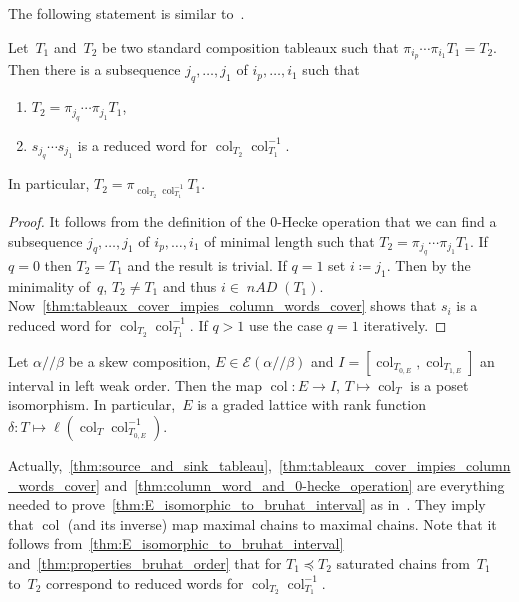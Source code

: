 \documentclass[ALCO,ThmDefs,Unicode,epreuves]{cedram}
\newcommand{\mc}[1]{\mathcal{#1} }
\newcommand{\nAD}{\operatorname{\mathit{nAD}}}
\newcommand{\fs}{s}
\newcommand{\col}{\operatorname{col}}
\newcommand{\ab}{{\alpha / \! \! / \beta}}
\newcommand{\pleq}{\preceq}
\begin{document}
The following statement is similar to~\cite[Lemma~4.3]{Tewari2015}.
\begin{lemma}
	\label{thm:column_word_and_0-hecke_operation}
	Let~$T_1$ and~$T_2$ be two standard composition tableaux such that $\pi_{i_p} \cdots \pi_{i_1} T_1 = T_2$. Then there is a subsequence $j_q, \ldots, j_1$ of $i_p, \ldots,i_1$ such that
	\begin{enumerate}
		\item
		$T_2 = \pi_{j_q} \cdots \pi_{j_1}T_1$,
		\item 
		$\fs_{j_q} \cdots \fs_{j_1}$ is a reduced word for $\col_{T_2}\col^{-1}_{T_1}$.
	\end{enumerate}
	In particular, $T_2 = \pi_{\col_{T_2}\col^{-1}_{T_1}} T_1$.
\end{lemma}


\begin{proof} It follows from the definition of the 0-Hecke operation that we can find a subsequence $j_q, \ldots, j_1$ of $i_p, \ldots,i_1$ of minimal length such that $T_2 = \pi_{j_q} \cdots \pi_{j_1}T_1$. If~$q=0$ then $T_2 = T_1$ and the result is trivial. If $q=1$ set $i \coloneqq j_1$. Then by the minimality of~$q$, $T_2 \neq T_1$ and thus $i\in \nAD(T_1)$. Now~\cref{thm:tableaux_cover_impies_column_words_cover} shows that $\fs_i$ is a reduced word for $\col_{T_2}\col^{-1}_{T_1}$. If $q>1$ use the case $q=1$ iteratively.
\end{proof}



\begin{thm}
	\label{thm:E_isomorphic_to_bruhat_interval}
	Let $\ab$ be a skew composition, $E\in \mc E(\ab)$ and $I = [\col_{T_{0,E}}, \col_{T_{1,E}}]$ an interval in left weak order. Then the map 
	$\col \colon E\to I$, $T\mapsto\col_T$ is a poset isomorphism. In particular,~$E$ is a graded lattice with rank function $\delta\colon T\mapsto \ell(\col_T \col^{-1}_{T_{0,E}})$.
\end{thm}

Actually,~\cref{thm:source_and_sink_tableau},~\cref{thm:tableaux_cover_impies_column_words_cover} and~\cref{thm:column_word_and_0-hecke_operation} are everything needed to prove~\cref{thm:E_isomorphic_to_bruhat_interval} as in~\cite{Tewari2015}. They imply that $\col$ (and its inverse) map maximal chains to maximal chains.
Note that it follows from~\cref{thm:E_isomorphic_to_bruhat_interval} and~\cref{thm:properties_bruhat_order} that for $T_1 \pleq T_2$ saturated chains from~$T_1$ to~$T_2$ correspond to reduced words for $\col_{T_2}\col^{-1}_{T_1}$.
\end{document}
